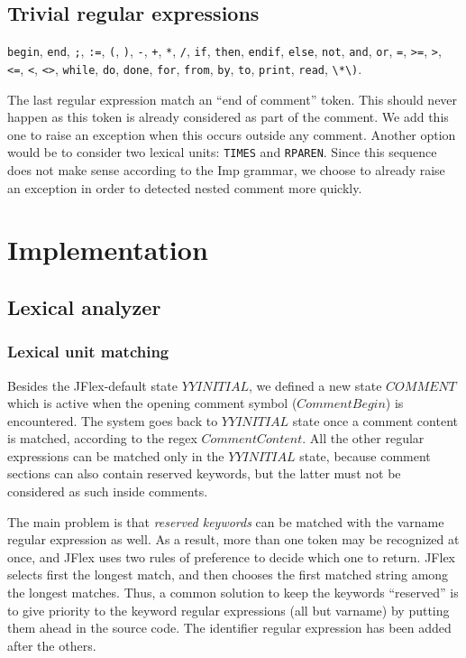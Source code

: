 \documentclass[12pt]{report}
\begin{document}
\section{Trivial regular expressions}

\texttt{begin},
\texttt{end},
\texttt{;},
\texttt{:=},
\texttt{(},
\texttt{)},
\texttt{-},
\texttt{+},
\texttt{*},
\texttt{/},
\texttt{if},
\texttt{then},
\texttt{endif},
\texttt{else},
\texttt{not},
\texttt{and},
\texttt{or},
\texttt{=},
\texttt{>=},
\texttt{>},
\texttt{<=},
\texttt{<},
\texttt{<>},
\texttt{while},
\texttt{do},
\texttt{done},
\texttt{for},
\texttt{from},
\texttt{by},
\texttt{to},
\texttt{print},
\texttt{read},
\texttt{\textbackslash{}*\textbackslash)}.

The last regular expression match an ``end of comment'' token. This should never happen as this token is already
considered as part of the comment. We add this one to raise an exception when this occurs outside any comment. Another
option would be to consider two lexical units: \texttt{TIMES} and \texttt{RPAREN}. Since this sequence does not make sense
according to the Imp grammar, we choose to already raise an exception in order to detected nested comment more quickly.

\chapter{Implementation}

\section{Lexical analyzer}

\subsection{Lexical unit matching}

Besides the JFlex-default state $YYINITIAL$, we defined a new state $COMMENT$ which is active when the opening comment symbol ($CommentBegin$) is encountered. The system goes back to $YYINITIAL$ state once a comment content is matched, according to the regex $CommentContent$.
All the other regular expressions can be matched only in the $YYINITIAL$ state, because comment sections can also contain reserved keywords, but the latter
must not be considered as such inside comments.


The main problem is that \textit{reserved keywords} can be matched with the varname regular expression as well. As a
result, more than one token may be recognized at once, and JFlex uses two rules of preference to decide which one to
return. JFlex selects first the longest match, and then chooses the first matched string among the longest matches.
Thus, a common solution to keep the keywords ``reserved'' is to give priority to the keyword regular expressions (all
but varname) by putting them ahead in the source code. The identifier regular expression has been added after the others.
\end{document}
